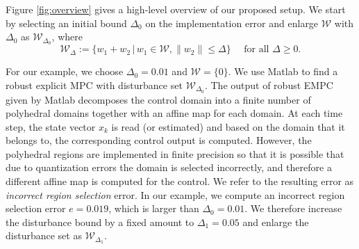 
	
Figure \ref{fig:overview} gives a high-level overview of our proposed setup.
We start by selecting an initial bound $\Delta_0$ on the implementation error and enlarge $\mathcal W$ with $\Delta_0$ as $\mathcal W_{\Delta_0}$, where
\begin{equation}\label{eq:W_delta}
\mathcal W_{\Delta} := \{w_1+w_2 \,|\, w_1\in \mathcal W, \|w_2\|\le \Delta\}
\quad\text{ for all } \Delta\ge 0.
\end{equation}
 
For our example, we choose $\Delta_0=0.01$ and $\mathcal W = \{0\}$. 
We use Matlab to find a robust explicit MPC with disturbance set $\mathcal W_{\Delta_0}$. 
%
The output of robust EMPC given by Matlab decomposes the control domain into a
finite number of polyhedral domains together with an affine map for each domain. 
At each time step, the state vector $x_k$ is read (or estimated) and based on the domain
that it belongs to, the corresponding control output is computed. 
However, the polyhedral regions are implemented in finite precision so that
it is possible that due to quantization errors the domain is selected incorrectly, and therefore
a different affine map is computed for the control.
We refer to the resulting error as \emph{incorrect region selection} error.
In our example, we compute an incorrect region selection error $e = 0.019$, which is larger
than $\Delta_0=0.01$. We therefore increase the disturbance bound by a fixed amount  to
$\Delta_1 = 0.05$ and enlarge the disturbance set as $\mathcal W_{\Delta_1}$. 

